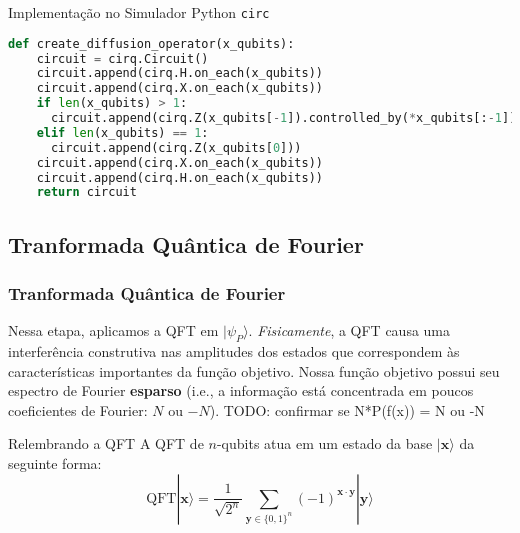 \documentclass[aspectratio=169]{beamer}
\begin{document}
\begin{frame}[fragile]
  
  \begin{block}{Implementação no Simulador Python \lstinline|circ|}
  \begin{lstlisting}[language=Python, frame=single, basicstyle=\tiny]
def create_diffusion_operator(x_qubits):
    circuit = cirq.Circuit()
    circuit.append(cirq.H.on_each(x_qubits))
    circuit.append(cirq.X.on_each(x_qubits))
    if len(x_qubits) > 1:
      circuit.append(cirq.Z(x_qubits[-1]).controlled_by(*x_qubits[:-1]))
    elif len(x_qubits) == 1:
      circuit.append(cirq.Z(x_qubits[0]))
    circuit.append(cirq.X.on_each(x_qubits))
    circuit.append(cirq.H.on_each(x_qubits))
    return circuit
  \end{lstlisting}
  \end{block}
\end{frame}



\subsection{Tranformada Quântica de Fourier}
\begin{frame}
  \frametitle{Tranformada Quântica de Fourier}

  Nessa etapa, aplicamos a QFT em $|\psi_P\rangle$. 
  \vfill
  \textit{Fisicamente}, a QFT causa uma interferência construtiva nas amplitudes dos estados que correspondem às características importantes da função objetivo. 
  Nossa função objetivo possui seu espectro de Fourier \textbf{esparso} (i.e., a informação está concentrada em poucos coeficientes de Fourier: $N$ ou $-N$). TODO: confirmar se N*P(f(x)) = N ou -N
  
  \begin{block}{Relembrando a QFT}
    A QFT de $n$-qubits atua em um estado da base $|\mathbf{x}\rangle$ da seguinte forma:
    $$
    \text{QFT}|\mathbf{x}\rangle = \frac{1}{\sqrt{2^n}} \sum_{\mathbf{y} \in \{0,1\}^n} (-1)^{\mathbf{x} \cdot \mathbf{y}} |\mathbf{y}\rangle
    $$
  \end{block}
\end{frame}
\end{document}
